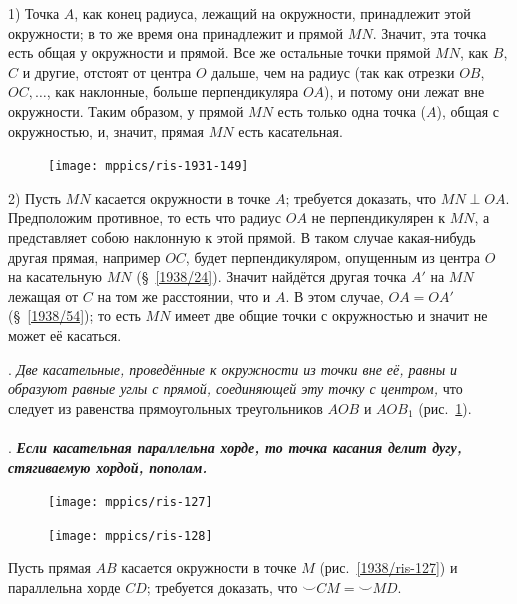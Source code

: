 \documentclass[oneside]{book}
\begin{document}
1) Точка $A$, как конец радиуса, лежащий на окружности, принадлежит этой окружности;
в то же время она принадлежит и прямой $MN$.
Значит, эта точка есть общая у окружности и прямой.
Все же остальные точки прямой $MN$, как $B$, $C$ и другие, отстоят от центра $O$ дальше, чем на радиус (так как отрезки $OB$, $OC,\dots$, как наклонные, больше перпендикуляра $OA$), и потому они лежат вне окружности.
Таким образом, у прямой $MN$ есть только одна точка ($A$), общая с окружностью, и, значит, прямая $MN$ есть касательная.

\begin{figure}
\centering
\texttt{[image: mppics/ris-1931-149]}
\caption{}\label{1931/ris-149}
\end{figure}

2) Пусть $MN$ касается окружности в точке $A$; требуется доказать, что $MN\perp OA$.
Предположим противное, то есть что радиус $OA$ не перпендикулярен к $MN$, а представляет собою наклонную к этой прямой.
В таком случае какая-нибудь другая прямая, например $OC$, будет перпендикуляром, опущенным из центра $O$ на касательную $MN$ (§~\ref{1938/24}).
Значит найдётся другая точка $A'$ на $MN$ лежащая от $C$ на том же расстоянии, что и $A$.
В этом случае, $OA=OA'$ (§~\ref{1938/54});
то есть $MN$ имеет две общие точки с окружностью и значит не может её касаться.

\smallskip
\mbox{.}
\emph{Две касательные, проведённые к окружности из точки вне её, равны и образуют равные углы с прямой, соединяющей эту точку с центром,} что следует из равенства прямоугольных треугольников $AOB$ и $AOB_1$ (рис.~\ref{1931/ris-149}).

\paragraph{}\label{1938/114}
\mbox{.}
\textbf{\emph{Если касательная параллельна хорде, то точка касания делит дугу, стягиваемую хордой, пополам.}}

\begin{figure}
\centering
\texttt{[image: mppics/ris-127]}
\caption{}\label{1938/ris-127}
\bigskip
\texttt{[image: mppics/ris-128]}
\caption{}\label{1938/ris-128}
\end{figure}

Пусть прямая $AB$ касается окружности в точке $M$ (рис.~\ref{1938/ris-127}) и параллельна хорде $CD$;
требуется доказать, что ${\smallsmile}CM={\smallsmile}MD$.
\end{document}
